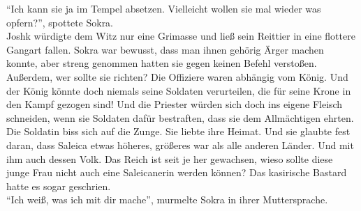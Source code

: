 ``Ich kann sie ja im Tempel absetzen. Vielleicht wollen sie mal wieder was opfern?'', spottete 
Sokra.\\
Joshk würdigte dem Witz nur eine Grimasse und ließ sein Reittier in eine flottere Gangart fallen.
Sokra war bewusst, dass man ihnen gehörig Ärger machen konnte, aber streng genommen hatten sie gegen 
keinen Befehl verstoßen. Außerdem, wer sollte sie richten? Die Offiziere waren abhängig vom König. 
Und der König könnte doch niemals seine Soldaten verurteilen, die für seine Krone in 
den Kampf gezogen sind! Und die Priester würden sich doch ins eigene Fleisch schneiden, wenn sie 
Soldaten dafür bestraften, dass sie dem Allmächtigen ehrten.\\
Die Soldatin biss sich auf die Zunge. Sie liebte ihre Heimat. Und sie glaubte fest daran, dass 
Saleica etwas höheres, größeres war als alle anderen Länder. Und mit ihm auch dessen Volk. 
Das Reich ist seit je her gewachsen, wieso sollte diese junge Frau nicht auch eine Saleicanerin 
werden können? Das kasirische Bastard hatte es sogar geschrien.\\
``Ich weiß, was ich mit dir mache'', murmelte Sokra in ihrer Muttersprache.\\
